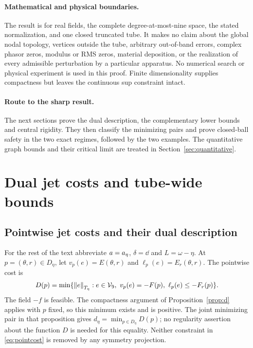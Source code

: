 \documentclass[11pt,a4paper]{article}
\begin{document}
\paragraph{Mathematical and physical boundaries.}
The result is for real fields, the complete degree-at-most-nine space,
the stated normalization, and one closed truncated tube. It makes no
claim about the global nodal topology, vertices outside the tube,
arbitrary out-of-band errors, complex phasor zeros, modulus or RMS zeros,
material deposition, or the realization of every admissible perturbation
by a particular apparatus. No numerical search or physical experiment is
used in this proof. Finite dimensionality supplies compactness but leaves
the continuous sup constraint intact.


\paragraph{Route to the sharp result.}
The next sections prove the dual description, the complementary lower
bounds and central rigidity. They then classify the minimizing pairs
and prove closed-ball safety in the two exact regimes, followed by
the two examples. The quantitative graph bounds and their critical
limit are treated in Section~\ref{sec:quantitative}.

\section{Dual jet costs and tube-wide bounds}\label{sec:dualandbounds}

\subsection{Pointwise jet costs and their dual description}\label{sec:dual}

For the rest of the text abbreviate $a=a_\eta$, $\delta=\dd$ and
$L=\omega-\eta$. At $p=(\theta,r)\in D_\eta$, let
$v_p(e)=E(\theta,r)$ and $\ell_p(e)=E_r(\theta,r)$. The pointwise cost is
\begin{equation}\label{eq:pointcost}
 D(p)=\min\{\left\lVert e\right\rVert_{T_\eta}:e\in\mathcal V_9,\ v_p(e)=-F(p),\
                         \ell_p(e)\le-F_r(p)\}.
\end{equation}
The field $-f$ is feasible. The compactness argument of
Proposition~\ref{prop:d} applies with $p$ fixed, so this minimum exists
and is positive. The joint minimizing pair in that proposition gives
$d_\eta=\min_{p\in D_\eta}D(p)$; no regularity assertion about the
function $D$ is needed for this equality. Neither constraint in
\eqref{eq:pointcost} is removed by any symmetry projection.
\end{document}
